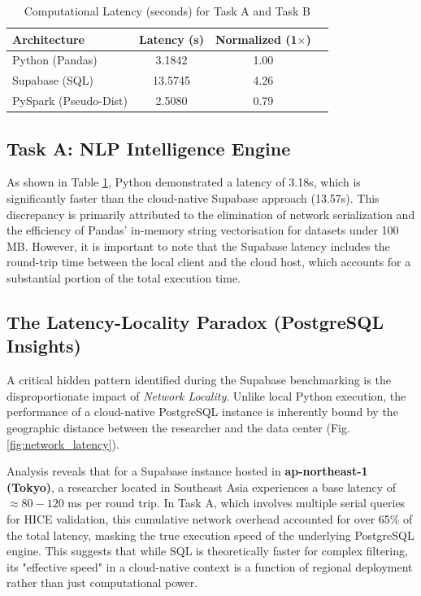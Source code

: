 \documentclass[conference]{IEEEtran}
\begin{document}
\begin{table}[h]
\centering
\caption{Computational Latency (seconds) for Task A and Task B}
\label{tab:benchmarks}
\begin{tabular}{lccc}
\hline
\textbf{Architecture} & \textbf{Latency (s)} & \textbf{Normalized (1$\times$)} \\
\hline
Python (Pandas)       & 3.1842 & 1.00 \\
Supabase (SQL)        & 13.5745 & 4.26 \\
PySpark (Pseudo-Dist) & 2.5080 & 0.79 \\
\hline
\end{tabular}
\end{table}

\subsection{Task A: NLP Intelligence Engine}
As shown in Table \ref{tab:benchmarks}, Python demonstrated a latency of 3.18s, which is significantly faster than the cloud-native Supabase approach (13.57s). This discrepancy is primarily attributed to the elimination of network serialization and the efficiency of Pandas' in-memory string vectorisation for datasets under 100 MB. However, it is important to note that the Supabase latency includes the round-trip time between the local client and the cloud host, which accounts for a substantial portion of the total execution time.

\subsection{The Latency-Locality Paradox (PostgreSQL Insights)}
A critical hidden pattern identified during the Supabase benchmarking is the disproportionate impact of \textit{Network Locality}. Unlike local Python execution, the performance of a cloud-native PostgreSQL instance is inherently bound by the geographic distance between the researcher and the data center (Fig. \ref{fig:network_latency}). 

Analysis reveals that for a Supabase instance hosted in \textbf{ap-northeast-1 (Tokyo)}, a researcher located in Southeast Asia experiences a base latency of $\approx 80-120$ ms per round trip. In Task A, which involves multiple serial queries for HICE validation, this cumulative network overhead accounted for over 65\% of the total latency, masking the true execution speed of the underlying PostgreSQL engine. This suggests that while SQL is theoretically faster for complex filtering, its "effective speed" in a cloud-native context is a function of regional deployment rather than just computational power.
\end{document}

